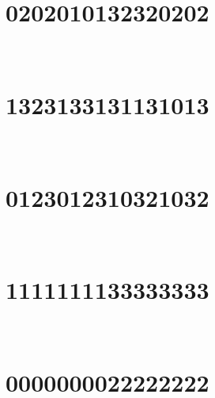 \section{0202010132320202}

\marginnote[3\baselineskip]{\centering}



\,
\newline
\vspace{1.2cm}

\section{1323133131131013}

\marginnote[3\baselineskip]{\centering}



\,
\newline
\vspace{1.2cm}

\section{0123012310321032}

\marginnote[3\baselineskip]{\centering}



\,
\newline
\vspace{1.2cm}

\section{1111111133333333}

\marginnote[3\baselineskip]{\centering}



\,
\newline
\vspace{1.2cm}

\section{0000000022222222}

